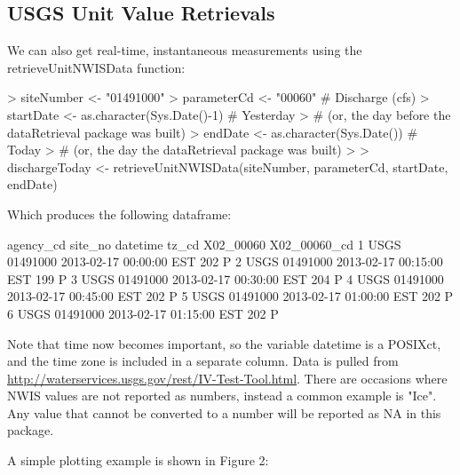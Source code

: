 \documentclass[a4paper,11pt]{article}
\begin{document}
\subsection{USGS Unit Value Retrievals}
\label{sec:usgsRT}
We can also get real-time, instantaneous measurements using the retrieveUnitNWISData function:
\begin{Schunk}
\begin{Sinput}
> siteNumber <- "01491000"
> parameterCd <- "00060"  # Discharge (cfs)
> startDate <- as.character(Sys.Date()-1) # Yesterday 
>   # (or, the day before the dataRetrieval package was built)
> endDate <- as.character(Sys.Date()) # Today 
>   # (or, the day the dataRetrieval package was built)
> 
> dischargeToday <- retrieveUnitNWISData(siteNumber, parameterCd, 
         startDate, endDate)
\end{Sinput}
\end{Schunk}
Which produces the following dataframe:
\begin{Schunk}
\begin{Soutput}
  agency_cd  site_no            datetime tz_cd X02_00060 X02_00060_cd
1      USGS 01491000 2013-02-17 00:00:00   EST       202            P
2      USGS 01491000 2013-02-17 00:15:00   EST       199            P
3      USGS 01491000 2013-02-17 00:30:00   EST       204            P
4      USGS 01491000 2013-02-17 00:45:00   EST       202            P
5      USGS 01491000 2013-02-17 01:00:00   EST       202            P
6      USGS 01491000 2013-02-17 01:15:00   EST       202            P
\end{Soutput}
\end{Schunk}

Note that time now becomes important, so the variable datetime is a POSIXct, and the time zone is included in a separate column. Data is pulled from \url{http://waterservices.usgs.gov/rest/IV-Test-Tool.html}. There are occasions where NWIS values are not reported as numbers, instead a common example is "Ice".  Any value that cannot be converted to a number will be reported as NA in this package.

A simple plotting example is shown in Figure 2:
\begin{Schunk}
\end{Schunk}
\newpage
\end{document}
